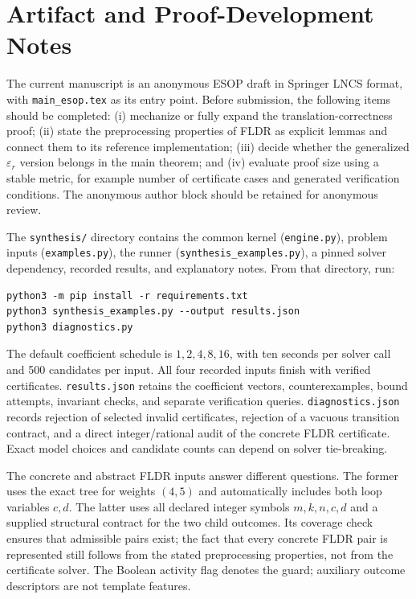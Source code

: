 \section{Artifact and Proof-Development Notes}
\label{app:artifact}

The current manuscript is an anonymous ESOP draft in Springer LNCS format, with \texttt{main\_esop.tex} as its entry point. Before submission, the following items should be completed: (i) mechanize or fully expand the translation-correctness proof; (ii) state the preprocessing properties of FLDR as explicit lemmas and connect them to its reference implementation; (iii) decide whether the generalized $\varepsilon_r$ version belongs in the main theorem; and (iv) evaluate proof size using a stable metric, for example number of certificate cases and generated verification conditions. The anonymous author block should be retained for anonymous review.

The \texttt{synthesis/} directory contains the common kernel
(\texttt{engine.py}), problem inputs (\texttt{examples.py}), the runner
(\texttt{synthesis\_examples.py}), a pinned solver dependency, recorded
results, and explanatory notes. From that directory, run:
\begin{lstlisting}[basicstyle=\ttfamily\small]
python3 -m pip install -r requirements.txt
python3 synthesis_examples.py --output results.json
python3 diagnostics.py
\end{lstlisting}
The default coefficient schedule is $1,2,4,8,16$, with ten seconds per solver
call and 500 candidates per input. All four recorded inputs finish with
verified certificates. \texttt{results.json} retains the coefficient vectors,
counterexamples, bound attempts, invariant checks, and separate verification
queries. \texttt{diagnostics.json} records rejection of selected invalid
certificates, rejection of a vacuous transition contract, and a direct
integer/rational audit of the concrete FLDR certificate. Exact model choices
and candidate counts can depend on solver tie-breaking.

The concrete and abstract FLDR inputs answer different questions. The former
uses the exact tree for weights $(4,5)$ and automatically includes both loop
variables $c,d$. The latter uses all declared integer symbols $m,k,n,c,d$
and a supplied structural contract for the two child outcomes. Its coverage
check ensures that admissible pairs exist; the fact that every concrete FLDR
pair is represented still follows from the stated preprocessing properties,
not from the certificate solver. The Boolean activity flag denotes the guard;
auxiliary outcome descriptors are not template features.

